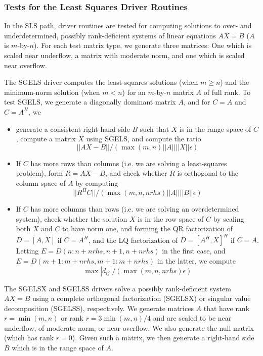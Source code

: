 \subsubsection{Tests for the Least Squares Driver Routines}
\dent
\begin{sloppypar}
In the SLS path, driver routines are tested for computing solutions
to over- and underdetermined, possibly rank-deficient systems of
linear equations $AX = B$ ($A$ is $m$-by-$n$). For each test
matrix type, we generate three matrices: One which is scaled near
underflow, a matrix with moderate norm, and one which is scaled
near overflow.
\end{sloppypar}
The SGELS driver
computes the least-squares
solutions (when $m \ge n$) and the
minimum-norm solution (when $m < n$) for an $m$-by-$n$ matrix $A$
of full rank. To test SGELS, we generate a diagonally
dominant matrix $A$, and for $C = A$ and $C = A^H$, we
\begin{itemize}
\item generate a consistent right-hand side $B$ such that $X$ is in
the range space of $C$, compute a matrix $X$ using SGELS, and compute
the ratio
        $$||AX - B||/(\max(m,n) ||A|| ||X|| \epsilon)$$

\item If $C$ has more rows than columns (i.e. we are solving a
least-squares problem), form $R = AX - B$, and check whether
$R$ is orthogonal to the column space of $A$ by computing
        $$|| R^H C ||/(\max(m,n,nrhs)||A|| ||B|| \epsilon)$$
\item
If $C$ has more columns than rows (i.e. we are solving an
overdetermined system), check whether the solution $X$ is
in the row space of $C$ by scaling both $X$ and $C$ to have
norm one, and forming the QR factorization
of $D = [A,X]$ if $C = A^H$, and the LQ factorization of
$D = [A^H,X]^H$ if $C = A$. Letting $E = D(n:n+nrhs,n+1,n+nrhs)$ in the
first case, and $E = D(m+1:m+nrhs,m+1:m+nrhs)$ in the latter,
we compute
        $$\max |d_{ij}| / (\max(m,n,nrhs) \epsilon)$$
\end{itemize}

The SGELSX and SGELSS drivers solve a possibly
rank-deficient system $A X = B$
using a complete orthogonal factorization (SGELSX)
or singular value decomposition (SGELSS), respectively. We generate
matrices $A$ that have  rank $r = \min(m,n)$ or rank $r = 3 \min(m,n)
/4$ and are
scaled to be near underflow, of moderate norm, or near overflow.
We also generate the null matrix (which has rank $r = 0$). Given such a
matrix, we then
generate a right-hand side $B$ which is in the range space of $A$.

